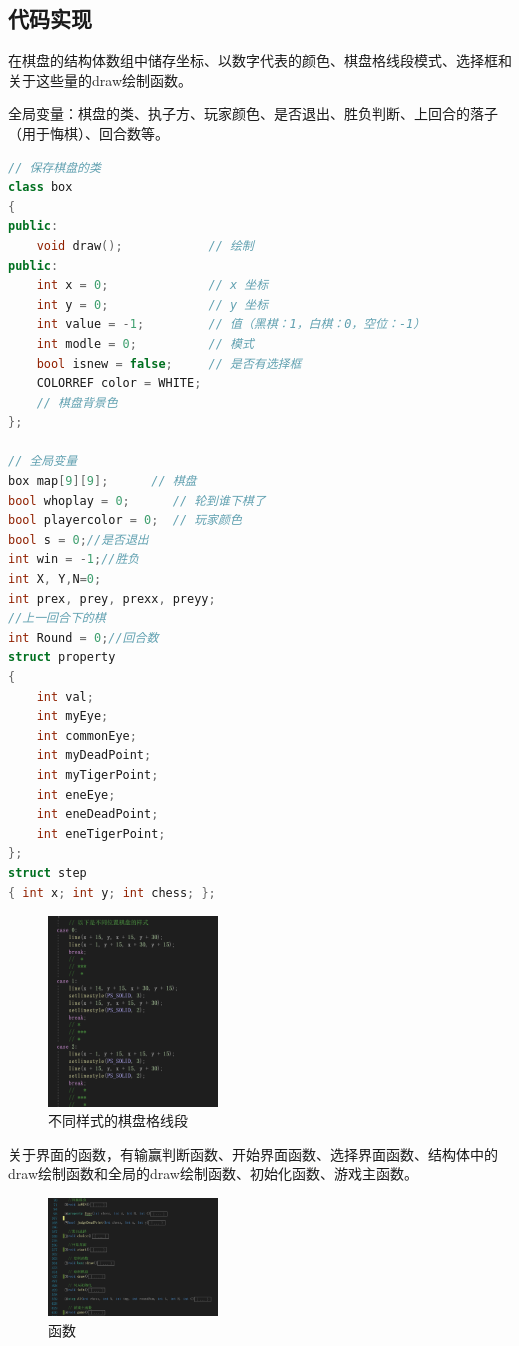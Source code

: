 \documentclass[twocolumn]{article}
\begin{document}
\subsection{代码实现}

在棋盘的结构体数组中储存坐标、以数字代表的颜色、棋盘格线段模式、选择框和关于这些量的draw绘制函数。

\par

全局变量：棋盘的类、执子方、玩家颜色、是否退出、胜负判断、上回合的落子（用于悔棋）、回合数等。
\begin{lstlisting}[language=C++]
// 保存棋盘的类
class box
{
public:
	void draw();            // 绘制
public:
	int x = 0;              // x 坐标
	int y = 0;              // y 坐标
	int value = -1;         // 值（黑棋：1，白棋：0，空位：-1）
	int modle = 0;          // 模式
	bool isnew = false;     // 是否有选择框
	COLORREF color = WHITE; 
	// 棋盘背景色
};

// 全局变量
box map[9][9];      // 棋盘
bool whoplay = 0;      // 轮到谁下棋了
bool playercolor = 0;  // 玩家颜色
bool s = 0;//是否退出
int win = -1;//胜负
int X, Y,N=0;
int prex, prey, prexx, preyy;
//上一回合下的棋
int Round = 0;//回合数
struct property
{
	int val;
	int myEye;
	int commonEye;
	int myDeadPoint;
	int myTigerPoint;
	int eneEye;
	int eneDeadPoint;
	int eneTigerPoint;
};
struct step 
{ int x; int y; int chess; };
\end{lstlisting}
 
\begin{figure}[H]
\centering  %
\includegraphics[width=0.4\textwidth]{chess}
\caption{不同样式的棋盘格线段}
\label{Fig.main}
\end{figure}

关于界面的函数，有输赢判断函数、开始界面函数、选择界面函数、结构体中的draw绘制函数和全局的draw绘制函数、初始化函数、游戏主函数。
\begin{figure}[H]
\centering  %
\includegraphics[width=0.4\textwidth]{func}
\caption{函数}
\label{Fig.main}
\end{figure}
 
\end{document}
